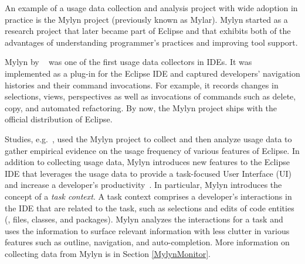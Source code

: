 
An example of a usage data collection and analysis project with wide adoption
in practice is the Mylyn project (previously known as Mylar). Mylyn started as a research project that later became part of Eclipse and that exhibits both of the advantages of understanding programmer's practices and improving tool support.

Mylyn by ~\citet{Kersten-Mylar2005} was one of the first usage data collectors in IDEs. It was
implemented as a plug-in for the Eclipse IDE and captured developers' navigation
histories and their command invocations. For example, it records changes in
selections, views, perspectives as well as invocations of commands such as
delete, copy, and automated refactoring. By now, the Mylyn project ships with the official distribution of Eclipse.

Studies, e.g.~\citep{V:Murphy2006How}, used the Mylyn project to collect and then analyze usage data to gather empirical evidence on the usage frequency of various features of Eclipse.  In addition to collecting usage data, Mylyn introduces new features to the Eclipse
IDE that leverages the usage data to provide a task-focused User Interface (UI) and increase a developer's productivity~\citep{Kersten-Mylyn}. In particular, Mylyn introduces the concept of a \emph{task context}. A task context comprises a developer's interactions in the IDE that are related to the task, such as selections and edits of code entities (\eg, files, classes, and packages). Mylyn analyzes the interactions for a task and uses the information to surface relevant information with less clutter in various features such as outline, navigation, and auto-completion.  More information on collecting data from Mylyn is in Section \ref{MylynMonitor}.

%



